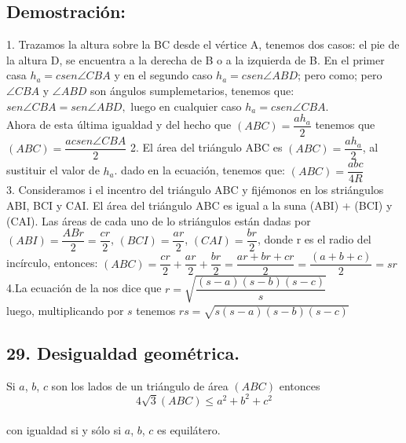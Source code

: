 \documentclass[12pt,a4paper]{article}
\begin{document}
\subsection*{Demostración:}
1. Trazamos la altura sobre la BC desde el vértice A, tenemos dos casos: el pie de la altura D, se encuentra a la derecha de B o a la izquierda de B. En el primer casa $h_a= c sen \angle CBA$ y en el segundo caso $h_a= c sen \angle ABD$; pero como; pero $\angle CBA$ y $\angle ABD$ son ángulos sumplemetarios, tenemos que: $sen \angle CBA= sen \angle ABD,$ luego en cualquier caso $h_a=c sen \angle CBA$.
\\Ahora de 
esta última igualdad y del hecho que $(ABC)= \dfrac{a h_a}{2}$ tenemos que $(ABC)=\dfrac{ac sen \angle CBA}{2}$
2. El área del triángulo ABC es $(ABC)=\dfrac{ah_a}{2}$, al sustituir el valor de $h_a$. dado en la ecuación, tenemos que: $(ABC)=\dfrac{abc}{4R}$
\\3. Consideramos i el incentro del triángulo ABC y fijémonos en los striángulos ABI, BCI y CAI. El área del triángulo ABC es igual a la suna (ABI) + (BCI) y (CAI). Las áreas de cada uno de lo striángulos están dadas por $(ABI)= \dfrac{AB r}{2}= \dfrac{cr}{2}$, $(BCI)=\dfrac{ar}{2}$, $(CAI)=\dfrac{br}{2}$, donde r es el radio del incírculo, entonces:
$(ABC)=\dfrac{cr}{2}+\dfrac{ar}{2}+\dfrac{br}{2}=\dfrac{ar+br+cr}{2}=\dfrac{(a+b+c)}{2}=sr$
\\4.La ecuación de la nos dice que
$r=\sqrt{\dfrac{(s-a)(s-b)(s-c)}{s}}$
\\luego, multiplicando por $s$ tenemos
$ rs=\sqrt{s(s-a)(s-b)(s-c)}$
\subsection*{29. Desigualdad geométrica.}
Si $a$, $b$, $c$ son los lados de un triángulo de área $(ABC)$ entonces $$4\sqrt{3}(ABC) \leq a^2 + b^2 + c^2$$
\\con igualdad si y sólo si $a$, $b$, $c$ es equilátero.
\end{document}
